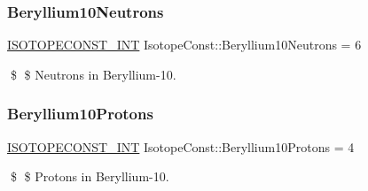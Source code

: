 \subsubsection{\texorpdfstring{Beryllium10\+Neutrons}{Beryllium10Neutrons}}
{\footnotesize\ttfamily \mbox{\hyperlink{group___isotope_const-_macros_ga5f18360b3e99483a35c32d789e62621c}{I\+S\+O\+T\+O\+P\+E\+C\+O\+N\+S\+T\+\_\+\+I\+NT}} Isotope\+Const\+::\+Beryllium10\+Neutrons = 6}

\$ \$ Neutrons in Beryllium-\/10. \mbox{\label{group___isotope_const-_beryllium-_be10_ga9d3f71f87075d688d43ada31e81d14b5}} 
\subsubsection{\texorpdfstring{Beryllium10\+Protons}{Beryllium10Protons}}
{\footnotesize\ttfamily \mbox{\hyperlink{group___isotope_const-_macros_ga5f18360b3e99483a35c32d789e62621c}{I\+S\+O\+T\+O\+P\+E\+C\+O\+N\+S\+T\+\_\+\+I\+NT}} Isotope\+Const\+::\+Beryllium10\+Protons = 4}

\$ \$ Protons in Beryllium-\/10. 
